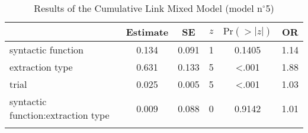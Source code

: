 \begin{table}
\begin{tabular}{l S[table-format=1.3] S[table-format=1.3] c S[table-format=<1.4] S[table-format=1.2]}
  \lsptoprule
 & {Estimate} & {SE} & {$z$} & {$\text{Pr}(>|z|)$} & {OR} \\ 
  \midrule
  syntactic function & 0.134 & 0.091 & 1 & 0.1405 & 1.14 \\ 
  extraction type & 0.631 & 0.133 & 5 & <.001 & 1.88 \\ 
  trial & 0.025 & 0.005 & 5 & <.001 & 1.03 \\ 
  syntactic function:extraction type & 0.009 & 0.088 & 0 & 0.9142 & 1.01 \\ 
   \lspbottomrule
\end{tabular}
\caption{Results of the Cumulative Link Mixed Model (model n$^{\circ}$5)}
\label{tab:exp13-m5}
\end{table}
